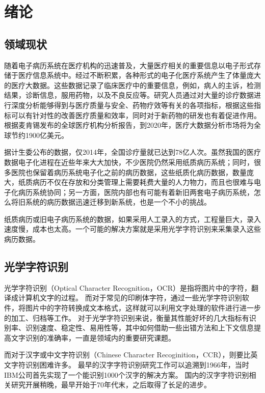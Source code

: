 ﻿\chapter{绪论}
\label{chap:introduction}

\section{领域现状}
随着电子病历系统在医疗机构的迅速普及，大量医疗相关的重要信息以电子形式存储于医疗信息系统中。经过不断积累，各种形式的电子化医疗系统产生了体量庞大的医疗大数据。这些数据记录了临床医疗中的重要信息，例如，病人的主诉，检测结果，诊断信息，服用药物，以及不良反应等。研究人员通过对大量的诊疗数据进行深度分析能够得到与医疗质量与安全、药物疗效等有关的各项指标，根据这些指标可以有针对性的改善医疗质量和效率，同时对于新药物的研发也有着促进作用。根据麦肯锡发布的全球医疗机构分析报告，到2020年，医疗大数据分析市场将为全球节约1900亿美元。

据计生委公布的数据，仅2014年，全国诊疗量就已达到78亿人次。虽然我国的医疗数据电子化进程在近些年来大大加快，不少医院仍然采用纸质病历系统；同时，很多医院也保留着病历系统电子化之前的病历数据，这些纸质化病历数据，数量庞大，纸质病历不仅在存放和分类管理上需要耗费大量的人力物力，而且也很难与电子化病历系统协同；另一方面，医院内部也有可能有着新旧两套电子病历系统，怎么将旧系统的病历数据迅速迁移到新系统，也是一个不小的挑战。

纸质病历或旧电子病历系统的数据，如果采用人工录入的方式，工程量巨大，录入速度慢，成本也太高。一个可能的解决方案就是采用光学字符识别来采集录入这些病历数据。

\section{光学字符识别}
光学字符识别（Optical Character Recognition，OCR）是指将图片中的字符，翻译成计算机文字的过程。\citep{mori1992historical}
而对于常见的印刷体字符，通过一些光学字符识别软件，将图片中的字符转换成文本格式，这样就可以利用文字处理的软件进行进一步的加工、归档等工作。
对于光学字符识别来说，衡量其性能好坏的几大指标有识别率、识别速度、稳定性、易用性等，其中如何借助一些出错方法和上下文信息提高文字识别的准确率，一直是领域内的重要研究课题。

而对于汉字或中文字符识别（Chinese Character Recoginition，CCR），则要比英文字符识别困难许多。
最早的汉字字符识别研究工作可以追溯到1966年，当时IBM公司首先实现了一个能识别1000个汉字的解决方案。
国内的汉字字符识别相关研究开展稍晚，最早开始于70年代末\citep{trier1996feature}，之后取得了长足的进步\citep{FanxiaGuo,LongDing}。

